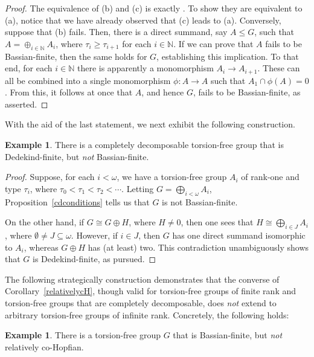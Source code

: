 \documentclass[12pt]{amsart}
\theoremstyle{definition}
\newtheorem{example}[theorem]{Example}
\def\N{{\mathbb N}}
\begin{document}
\begin{proof} The equivalence of (b) and (c) is exactly \cite[Proposition~2.35]{CDK}. To show they are equivalent to (a), notice that we have already observed that (c) leads to (a). Conversely, suppose that (b) fails. Then, there is a direct summand, say $A\leq G$, such that $A=\oplus_{i\in \N} A_i$, where $\tau_i\geq \tau_{i+1}$ for each $i\in \N$. If we can prove that $A$ fails to be Bassian-finite, then the same holds for $G$, establishing this implication. To that end, for each $i\in \N$ there is apparently a monomorphism $A_i\to A_{i+1}$. These can all be combined into a single monomorphism $\phi:A\to A$ such that $A_1\cap \phi(A)=0$. From this, it follows at once that $A$, and hence $G$, fails to be Bassian-finite, as asserted.
\end{proof}

With the aid of the last statement, we next exhibit the following construction.

\begin{example}\label{dedfin} There is a completely decomposable torsion-free group that is Dedekind-finite, but {\it not} Bassian-finite.
\end{example}

\begin{proof} Suppose, for each $i<\omega$, we have a torsion-free group $A_i$ of rank-one and type $\tau_i$, where
$
               \tau_0<\tau_1<\tau_2<\cdots.
$
Letting $G=\bigoplus_{i<\omega} A_i$, Proposition~\ref{cdconditions} tells us that $G$ is not Bassian-finite. 

On the other hand, if $G\cong G\oplus H$, where $H\ne 0$, then one sees that $H\cong  \bigoplus_{i\in J} A_i$, where $\emptyset\ne J\subseteq \omega$. However, if $i\in J$, then $G$ has one direct summand isomorphic to $A_i$, whereas $G\oplus H$ has (at least) two. This contradiction unambiguously shows that $G$ is Dedekind-finite, as pursued.
\end{proof}

The following strategically construction demonstrates that the converse of Corollary~\ref{relativelycH}, though valid for torsion-free groups of finite rank and torsion-free groups that are completely decomposable, does {\it not} extend to arbitrary torsion-free groups of infinite rank. Concretely, the following holds:

\begin{example}\label{basfin}
There is a torsion-free group $G$ that is Bassian-finite, but {\it not} relatively co-Hopfian.
\end{example}
\end{document}
